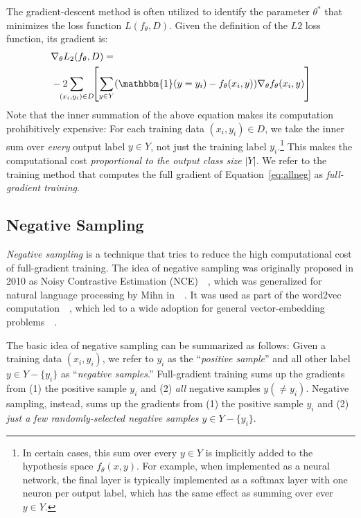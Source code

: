 The gradient-descent method is often utilized to identify the parameter $\theta^*$ that minimizes the loss function $L(f_{\theta}, D)$. Given the definition of the $L2$ loss function, its gradient is:
\small
\begin{align}
&\nabla_{\theta} L_2(f_{\theta},D) =\nonumber\\
&-2\!\!\!\!\!\!\sum_{(x_i,y_i)\in D} \!\!\left[\sum_{y \in Y} 
(\mathbbm{1}(y=y_i) - f_{\theta}(x_i, y)) \nabla_{\theta} f_{\theta}(x_i, y)\right] \label{eq:allneg}    
\end{align}
\normalsize
Note that the inner summation of the above equation makes its computation prohibitively expensive: For each training data $(x_i, y_i) \in D$, we take the inner sum over \emph{every} output label $y \in Y$, not just the training label $y_i$.\footnote{In certain cases, this sum over every $y \in Y$ is implicitly added to the hypothesis space $f_{\theta}(x,y)$. For example, when implemented as a neural network, the final layer is typically implemented as a softmax layer with one neuron per output label, which has the same effect as summing over ever $y \in Y$.} This makes the computational cost \emph{proportional to the output class size $|Y|$}. We refer to the training method that computes the full gradient of Equation~\ref{eq:allneg} as \emph{full-gradient training}. 

\subsection{Negative Sampling}
\label{sec:negative}
\emph{Negative sampling} is a technique that tries to reduce the high computational cost of full-gradient training. The idea of negative sampling was originally proposed in 2010 as Noisy Contrastive Estimation (NCE)~~\citep{NCE}, which was generalized for natural language processing by Mihn in~~\citep{mnih2012fast}. It was used as part of the word2vec computation~~\citep{mikolov2013efficient}, which led to a wide adoption for general vector-embedding problems~~\citep{node2vec-kdd2016,barkan2016item2vec,grover2016node2vec}.

The basic idea of negative sampling can be summarized as follows: Given a training data $(x_i, y_i)$, we refer to $y_i$ as the ``\emph{positive sample}'' and all other label $y \in Y - \{y_i\}$ as ``\emph{negative samples}.''  Full-gradient training sums up the gradients from (1) the positive sample $y_i$ and (2) \emph{all} negative samples $y (\neq y_i)$. Negative sampling, instead, sums up the gradients from (1) the positive sample $y_i$ and (2) \emph{just a few randomly-selected negative samples $y \in Y- \{y_i\}$}.

